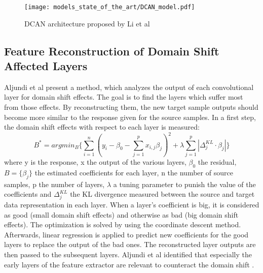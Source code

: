 \begin{figure}[H]
  \centering
  \texttt{[image: models\_state\_of\_the\_art/DCAN\_model.pdf]}
  \caption{DCAN architecture proposed by Li et al \cite{li2020}}
  \label{fig:DCAN_model}
\end{figure}

\subsection{Feature Reconstruction of Domain Shift Affected Layers}
Aljundi et al \cite{Aljundi2016} present a method, which analyzes the output of each convolutional layer for domain shift effects. The goal is to find the layers which suffer most from those effects. By reconstructing them, the new target sample outputs should become more similar to the response given for the source samples. In a first step, the domain shift effects with respect to each layer is measured:
\begin{equation}
    B^{*} = argmin_{B} \{ \sum_{i=1}^{n}( y_{i}-\beta_{0}-\sum_{j=1}^{p}x_{i,j}\beta_{j})^{2} + \lambda \sum_{j=1}^{p}|\Delta_{j}^{KL}\cdot \beta_{j}| \}
\end{equation}
where y is the response, x the output of the various layers, $\beta_{0}$ the residual, $B = \{\beta_{j}\}$ the estimated coefficients for each layer, n the number of
source samples, p the number of layers, $\lambda$ a tuning parameter to punish the value of the coefficients and $\Delta_{j}^{KL}$ the KL divergence measured between the source and target data representation in each layer. When a layer's coefficient is big, it is considered as good (small domain shift effects) and otherwise as bad (big domain shift effects). The optimization is solved by using the coordinate descent method. Afterwards, linear regression is applied to predict new coefficients for the good layers to replace the output of the bad ones. The reconstructed layer outputs are then passed to the subsequent layers. Aljundi et al identified that especially the early layers of the feature extractor are relevant to counteract the domain shift \cite{Aljundi2016}.